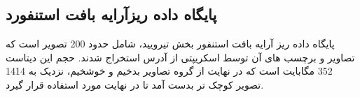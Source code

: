 \subsection{پایگاه داده ریزآرایه بافت استنفورد}\label{subsec:پایگاه-داده-ریزآرایه-بافت-استنفورد}
پایگاه داده ریز آرایه بافت استنفور\cite{marinelli2007stanford} بخش تیرویید، شامل حدود 200 تصویر است که تصاویر و برچسب های آن توسط اسکریپتی از آدرس \cite{stanfortissuemicroarray} استخراج شدند. حجم این دیتاست 352 مگابایت است که در نهایت از گروه تصاویر بدخیم و خوشخیم، نزدیک به 1414 تصویر کوچک تر بدست آمد تا در نهایت مورد استفاده قرار گیرد.

